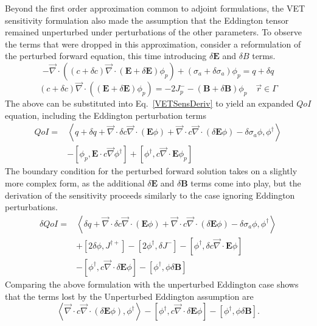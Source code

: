\documentclass{article}
\newcommand{\vr}{\vec{r}}
\newcommand{\bra}{\left\langle}
\newcommand{\ket}{\right\rangle}
\newcommand{\sbra}{\left[}
\newcommand{\sket}{\right]}
\newcommand{\vdiv}{\vec{\nabla} \cdot}
\newcommand{\vgrad}{\vec{\nabla}}
\newcommand{\Edd}{\mathbf{E}}
\newcommand{\BEdd}{\mathbf{B}}
\newcommand{\siga}{\sigma_a}
\newcommand{\isigt}{c}
\newcommand{\scalSource}{q}
\newcommand{\qoi}{QoI}
\begin{document}
Beyond the first order approximation common to adjoint formulations, the VET sensitivity formulation also made the assumption that the Eddington tensor remained unperturbed under perturbations of the other parameters. To observe the terms that were dropped in this approximation, consider a reformulation of the perturbed forward equation, this time introducing $\delta \Edd$ and $\delta  B$ terms. 
\begin{equation}
\label{VEFPerEdd}
- \vdiv \left((\isigt + \delta \isigt)\vdiv (\Edd + \delta \Edd) \phi_p \right) + (\siga + \delta \siga)\phi_p = \scalSource + \delta \scalSource
\end{equation}
\begin{equation}
(\isigt + \delta \isigt) \vec{\nabla} \cdot \left((\Edd + \delta \Edd) \phi_p \right)  = - 2J_p^- - (\BEdd +\delta \BEdd) \phi_p \quad \vr \in \Gamma
\end{equation}
The above can be substituted into Eq.~\eqref{VETSensDeriv} to yield an expanded $\qoi$ equation, including the Eddington perturbation terms
\begin{equation}
\label{QoIVETAdjNoBCEdd}
\begin{split}
\qoi =& \bra \scalSource + \delta \scalSource + \vdiv \delta \isigt \vdiv \left( \Edd \phi \right) + \vdiv \isigt \vdiv \left( \delta \Edd \phi \right) - \delta \siga \phi, \phi^\dag \ket \\
&- \sbra \phi_p, \Edd \cdot \isigt \vgrad \phi^\dag \sket 
+ \sbra \phi^\dag , \isigt \vdiv \Edd \phi_p \sket
\end{split}
\end{equation}
The boundary condition for the perturbed forward solution takes on a slightly more complex form, as the additional $\delta \Edd$ and $\delta \BEdd$ terms come into play, but the derivation of the sensitivity proceeds similarly to the case ignoring Eddington perturbations.
\begin{equation}
\label{QoIVETAdjEdd}
\begin{split}
\delta \qoi =& \bra \delta \scalSource + \vdiv \delta \isigt \vdiv \left( \Edd \phi \right) + \vdiv \isigt \vdiv \left( \delta \Edd \phi \right) - \delta \siga \phi, \phi^\dag \ket \\
&+ \sbra 2\delta \phi, J^{\dag +} \sket  - \sbra 2\phi^\dag, \delta J^- \sket
- \sbra \phi^\dag, \delta \isigt \vdiv \Edd \phi \sket
\\
&- \sbra  \phi^\dag ,\isigt \vdiv \delta \Edd \phi \sket
- \sbra \phi^\dag, \phi \delta \BEdd \sket
\end{split}
\end{equation} 
Comparing the above formulation with the unperturbed Eddington case shows that the terms lost by the Unperturbed Eddington assumption are 
\begin{equation}
\label{EddErr}
 \bra \vdiv \isigt \vdiv \left( \delta \Edd \phi \right), \phi^\dag \ket
- \sbra  \phi^\dag ,\isigt \vdiv \delta \Edd \phi \sket
- \sbra \phi^\dag, \phi \delta \BEdd \sket.
\end{equation} 
\end{document}
